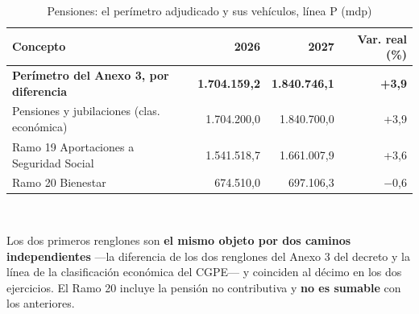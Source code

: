 \begin{table}[htbp]\centering\small
\caption{Pensiones: el perímetro adjudicado y sus vehículos, línea P (mdp)}\label{cua:pens}
\begin{tabular}{lrrr}
\toprule
Concepto & 2026 & 2027 & Var. real (\%) \\
\midrule
\textbf{Perímetro del Anexo 3, por diferencia} & \textbf{1.704.159,2} & \textbf{1.840.746,1} & \textbf{+3,9} \\
Pensiones y jubilaciones (clas. económica) & 1.704.200,0 & 1.840.700,0 & +3,9 \\
Ramo 19 Aportaciones a Seguridad Social & 1.541.518,7 & 1.661.007,9 & +3,6 \\
Ramo 20 Bienestar & 674.510,0 & 697.106,3 & $-$0,6 \\
\bottomrule
\end{tabular}
\\[2pt]\begin{minipage}{0.92\textwidth}\scriptsize Los dos primeros renglones son \textbf{el mismo objeto por dos caminos independientes} ---la diferencia de los dos renglones del Anexo 3 del decreto y la línea de la clasificación económica del CGPE--- y coinciden al décimo en los dos ejercicios. El Ramo 20 incluye la pensión no contributiva y \textbf{no es sumable} con los anteriores.\end{minipage}
\end{table}
